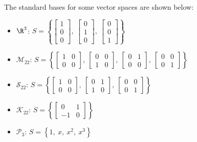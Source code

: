 \documentclass{article}
\begin{document}
The standard bases for some vector spaces are shown below:
\begin{itemize}
    \item \(\R^3\): \(S = \left\{ \begin{bmatrix*}
              1 \\ 0 \\ 0
          \end{bmatrix*},\: \begin{bmatrix*}
              0 \\ 1 \\ 0
          \end{bmatrix*},\: \begin{bmatrix*}
              0 \\ 0 \\ 1
          \end{bmatrix*} \right\}\)
    \item \(\mathscr{M}_{22}\): \(S = \left\{ \begin{bmatrix*}
              1 & 0 \\
              0 & 0
          \end{bmatrix*},\: \begin{bmatrix*}
              0 & 0 \\
              1 & 0
          \end{bmatrix*},\: \begin{bmatrix*}
              0 & 1 \\
              0 & 0
          \end{bmatrix*},\: \begin{bmatrix*}
              0 & 0 \\
              0 & 1
          \end{bmatrix*} \right\}\)
    \item \(\mathscr{S}_{22}\): \(S = \left\{ \begin{bmatrix*}
              1 & 0 \\
              0 & 0
          \end{bmatrix*},\: \begin{bmatrix*}
              0 & 1 \\
              1 & 0
          \end{bmatrix*},\: \begin{bmatrix*}
              0 & 0 \\
              0 & 1
          \end{bmatrix*} \right\}\)
    \item \(\mathscr{K}_{22}\): \(S = \left\{ \begin{bmatrix*}
              0 & 1 \\
              -1 & 0
          \end{bmatrix*}\right\}\)
    \item \(\mathscr{P}_3\): \(S = \left\{ 1,\: x,\: x^2,\: x^3 \right\}\)
\end{itemize}
\end{document}
